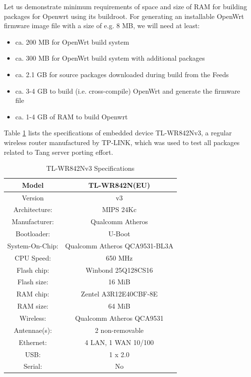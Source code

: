 Let us demonstrate minimum requirements of space and size of RAM for building packages for Openwrt using its buildroot.
For generating an installable OpenWrt firmware image file with a size of e.g. 8 MB, we will need at least:
\begin{itemize}
\item ca. 200 MB for OpenWrt build system
\item ca. 300 MB for OpenWrt build system with additional packages
\item ca. 2.1 GB for source packages downloaded during build from the Feeds
\item ca. 3-4 GB to build (i.e. cross-compile) OpenWrt and generate the firmware file
\item ca. 1-4 GB of RAM to build Openwrt
\end{itemize}

Table \ref{routerspec} lists the specifications of embedded device TL-WR842Nv3, a regular wireless router manufactured by TP-LINK, which was used to test all packages related to Tang server porting effort.

\begin{table}[H]
\centering
\label{routerspec}
\begin{tabular}{c|c}
\hline
Model           &   TL-WR842N(EU)                   \\ \hline
Version         &   v3                              \\ \hline
Architecture:   &   MIPS 24Kc                       \\ \hline
Manufacturer:   &   Qualcomm Atheros                \\ \hline
Bootloader:     &   U-Boot                          \\ \hline
System-On-Chip: &   Qualcomm Atheros QCA9531-BL3A   \\ \hline
CPU Speed:      &   650 MHz                         \\ \hline
Flash chip:     &   Winbond 25Q128CS16              \\ \hline
Flash size:     &   16 MiB                          \\ \hline
RAM chip:       &   Zentel A3R12E40CBF-8E           \\ \hline
RAM size:       &   64 MiB                          \\ \hline
Wireless:       &   Qualcomm Atheros QCA9531        \\ \hline
Antennae(s):    &   2 non-removable                 \\ \hline
Ethernet:       &   4 LAN, 1 WAN 10/100             \\ \hline
USB:            &   1 x 2.0                         \\ \hline
Serial:         &   No                              \\ \hline
\end{tabular}
\caption{TL-WR842Nv3 Specifications}
\end{table}

